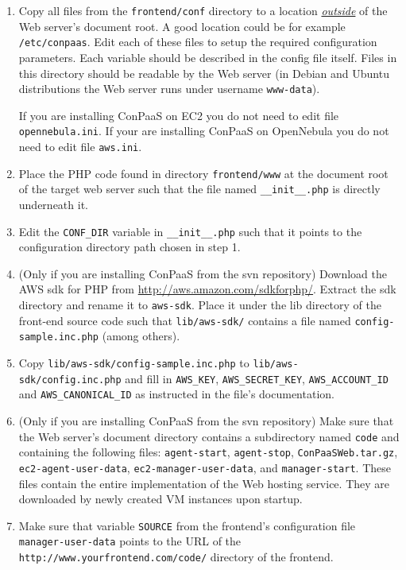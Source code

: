 \documentclass[10pt]{article}
\begin{document}
\begin{enumerate}
\item Copy all files from the \verb+frontend/conf+ directory to a
  location \uline{\emph{outside}} of the Web server's document root. A
  good location could be for example \verb+/etc/conpaas+. Edit each of
  these files to setup the required configuration parameters. Each
  variable should be described in the config file itself. Files in
  this directory should be readable by the Web server (in Debian and
  Ubuntu distributions the Web server runs under username
  \verb+www-data+). 

  If you are installing ConPaaS on EC2 you do not need to edit file
  \verb+opennebula.ini+. If your are installing ConPaaS on OpenNebula
  you do not need to edit file \verb+aws.ini+.

\item Place the PHP code found in directory \verb+frontend/www+ at the
  document root of the target web server such that the file named
  \verb+__init__.php+ is directly underneath it.

\item Edit the \verb+CONF_DIR+ variable in \verb+__init__.php+ such
  that it points to the configuration directory path chosen in step 1.

\item (Only if you are installing ConPaaS from the svn repository)
  Download the AWS sdk for PHP from
  \url{http://aws.amazon.com/sdkforphp/}.  Extract the sdk directory
  and rename it to \verb+aws-sdk+. Place it under the lib directory of
  the front-end source code such that \verb+lib/aws-sdk/+ contains a
  file named \verb+config-sample.inc.php+ (among others).

\item Copy \verb+lib/aws-sdk/config-sample.inc.php+ to
  \verb+lib/aws-sdk/config.inc.php+ and fill in \verb+AWS_KEY+,
  \verb+AWS_SECRET_KEY+, \verb+AWS_ACCOUNT_ID+ and
  \verb+AWS_CANONICAL_ID+ as instructed in the file's documentation.

\item (Only if you are installing ConPaaS from the svn repository)
  Make sure that the Web server's document directory contains a
  subdirectory named \verb+code+ and containing the following files:
  \verb+agent-start+, \verb+agent-stop+, \verb+ConPaaSWeb.tar.gz+,
  \verb+ec2-agent-user-data+, \verb+ec2-manager-user-data+, and
  \verb+manager-start+. These files contain the entire implementation
  of the Web hosting service. They are downloaded by newly created VM
  instances upon startup. 

\item Make sure that variable \verb+SOURCE+ from the frontend's
  configuration file \verb+manager-user-data+ points to the URL of the
  \verb+http://www.yourfrontend.com/code/+ directory of the frontend.
\end{enumerate}
\end{document}
